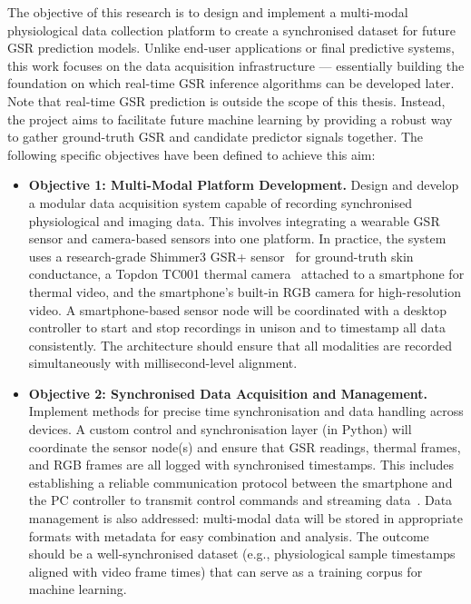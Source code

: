The objective of this research is to design and implement a multi-modal physiological data collection platform to create a synchronised dataset for future GSR prediction models. Unlike end-user applications or final predictive systems, this work focuses on the data acquisition infrastructure --- essentially building the foundation on which real-time GSR inference algorithms can be developed later. Note that real-time GSR prediction is outside the scope of this thesis. Instead, the project aims to facilitate future machine learning by providing a robust way to gather ground-truth GSR and candidate predictor signals together. The following specific objectives have been defined to achieve this aim:

\begin{itemize}
\item \textbf{Objective 1: Multi-Modal Platform Development.} Design and develop a modular data acquisition system capable of recording synchronised physiological and imaging data. This involves integrating a wearable GSR sensor and camera-based sensors into one platform. In practice, the system uses a research-grade Shimmer3 GSR+ sensor~\cite{shimmer2025gsr} for ground-truth skin conductance, a Topdon TC001 thermal camera~\cite{topdon2025developing} attached to a smartphone for thermal video, and the smartphone's built-in RGB camera for high-resolution video. A smartphone-based sensor node will be coordinated with a desktop controller to start and stop recordings in unison and to timestamp all data consistently. The architecture should ensure that all modalities are recorded simultaneously with millisecond-level alignment.

\item \textbf{Objective 2: Synchronised Data Acquisition and Management.} Implement methods for precise time synchronisation and data handling across devices. A custom control and synchronisation layer (in Python) will coordinate the sensor node(s) and ensure that GSR readings, thermal frames, and RGB frames are all logged with synchronised timestamps. This includes establishing a reliable communication protocol between the smartphone and the PC controller to transmit control commands and streaming data~\cite{lsl2025documentation}. Data management is also addressed: multi-modal data will be stored in appropriate formats with metadata for easy combination and analysis. The outcome should be a well-synchronised dataset (e.g., physiological sample timestamps aligned with video frame times) that can serve as a training corpus for machine learning.


\end{itemize}

